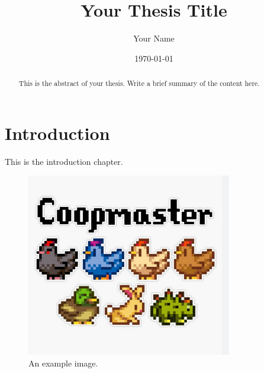 \documentclass[12pt, a4paper]{report}
\begin{document}
    \title{Your Thesis Title}
    \author{Your Name}
    \date{\today}
    \maketitle

    \begin{abstract}
        This is the abstract of your thesis. Write a brief summary of the content here.
    \end{abstract}

    \tableofcontents

    \printindex


    \chapter{Introduction}
    \label{chap:introduction}
    This is the introduction chapter.

    \begin{figure}[h!]
        \centering
        \includegraphics[width=0.8\textwidth]{./images/coopmaster}
        \caption{An example image.}
        \label{fig:example}
    \end{figure}
\end{document}
